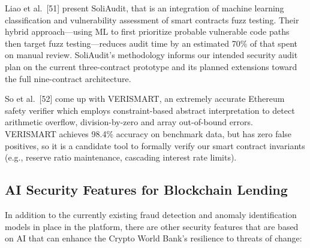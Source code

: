 \documentclass[12pt,a4paper]{report}
\begin{document}
Liao et al.~[51] present SoliAudit, that is an integration of machine learning classification and vulnerability assessment of smart contracts fuzz testing. Their hybrid approach---using ML to first prioritize probable vulnerable code paths then target fuzz testing---reduces audit time by an estimated 70\% of that spent on manual review. SoliAudit's methodology informs our intended security audit plan on the current three-contract prototype and its planned extensions toward the full nine-contract architecture.

So et al.~[52] come up with VERISMART, an extremely accurate Ethereum safety verifier which employs constraint-based abstract interpretation to detect arithmetic overflow, division-by-zero and array out-of-bound errors. VERISMART achieves 98.4\% accuracy on benchmark data, but has zero false positives, so it is a candidate tool to formally verify our smart contract invariants (e.g., reserve ratio maintenance, cascading interest rate limits).

\subsection{AI Security Features for Blockchain Lending}

In addition to the currently existing fraud detection and anomaly identification models in place in the platform, there are other security features that are based on AI that can enhance the Crypto World Bank's resilience to threats of change:
\end{document}
